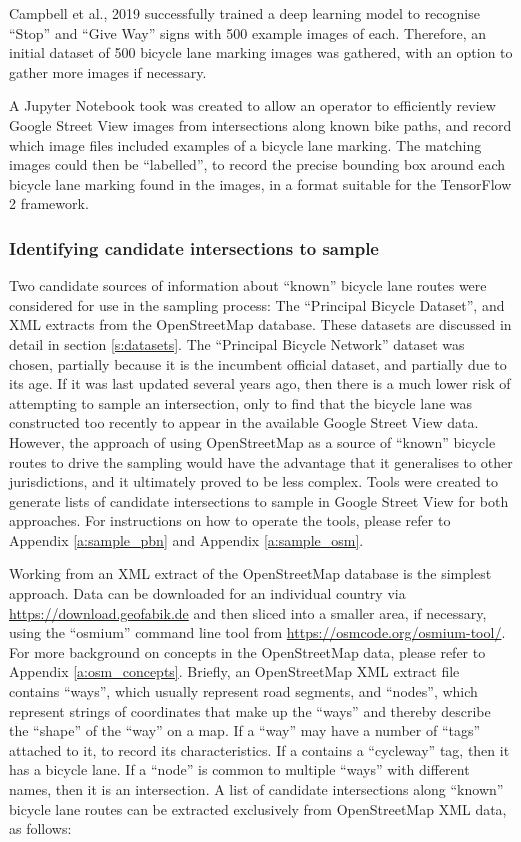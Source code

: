 \documentclass[11pt,twoside]{report}
\begin{document}
Campbell et al., 2019 \cite{CAMPBELL2019101350} successfully trained a deep learning model to recognise ``Stop'' and ``Give Way'' signs with 500 example images of each.  Therefore, an initial dataset of 500 bicycle lane marking images was gathered, with an option to gather more images if necessary.

A Jupyter Notebook took was created to allow an operator to efficiently review Google Street View images from intersections along known bike paths, and record which image files included examples of a bicycle lane marking.  The matching images could then be ``labelled'', to record the precise bounding box around each bicycle lane marking found in the images, in a format suitable for the TensorFlow 2 framework.

\subsubsection{Identifying candidate intersections to sample}
\label{s:sample_candidates}

Two candidate sources of information about ``known'' bicycle lane routes were considered for use in the sampling process:  The ``Principal Bicycle Dataset'', and XML extracts from the OpenStreetMap database.  These datasets are discussed in detail in section \ref{s:datasets}.  The ``Principal Bicycle Network'' dataset was chosen, partially because it is the incumbent official dataset, and partially due to its age.  If it was last updated several years ago, then there is a much lower risk of attempting to sample an intersection, only to find that the bicycle lane was constructed too recently to appear in the available Google Street View data.  However, the approach of using OpenStreetMap as a source of ``known'' bicycle routes to drive the sampling would have the advantage that it generalises to other jurisdictions, and it ultimately proved to be less complex.  Tools were created to generate lists of candidate intersections to sample in Google Street View for both approaches.  For instructions on how to operate the tools, please refer to Appendix \ref{a:sample_pbn} and Appendix \ref{a:sample_osm}.

Working from an XML extract of the OpenStreetMap database is the simplest approach.  Data can be downloaded for an individual country via \url{https://download.geofabik.de} and then sliced into a smaller area, if necessary, using the ``osmium'' command line tool from \url{https://osmcode.org/osmium-tool/}.  For more background on concepts in the OpenStreetMap data, please refer to Appendix \ref{a:osm_concepts}.  Briefly, an OpenStreetMap XML extract file contains ``ways'', which usually represent road segments, and ``nodes'', which represent strings of coordinates that make up the ``ways'' and thereby describe the ``shape'' of the ``way'' on a map.  If a ``way'' may have a number of ``tags'' attached to it, to record its characteristics.  If a contains a ``cycleway'' tag, then it has a bicycle lane.  If a ``node'' is common to multiple ``ways'' with different names, then it is an intersection.  A list of candidate intersections along ``known'' bicycle lane routes can be extracted exclusively from OpenStreetMap XML data, as follows:
\end{document}
